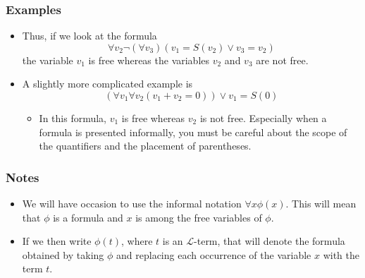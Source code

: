\subsubsection*{Examples}
\begin{itemize}
    \item Thus, if we look at the formula
    $$
    \forall v_{2} \neg\left(\forall v_{3}\right)\left(v_{1}=S\left(v_{2}\right) \vee v_{3}=v_{2}\right)
    $$
    the variable $v_{1}$ is free whereas the variables $v_{2}$ and $v_{3}$ are not free. 
    \item A slightly more complicated example is
        \[
        \left(\forall v_{1} \forall v_{2}\left(v_{1}+v_{2}=0\right)\right) \vee v_{1}=S(0)
        \]
        \begin{itemize}
            \item In this formula, $v_{1}$ is free whereas $v_{2}$ is not free. Especially when a formula is presented informally, you must be careful about the scope of the quantifiers and the placement of parentheses.
        \end{itemize}
\end{itemize}

\subsubsection*{Notes}
\begin{itemize}
    \item We will have occasion to use the informal notation $\forall x \phi(x)$. This will mean that $\phi$ is a formula and $x$ is among the free variables of $\phi$. 
    \item If we then write $\phi(t)$, where $t$ is an $\mathcal{L}$-term, that will denote the formula obtained by taking $\phi$ and replacing each occurrence of the variable $x$ with the term $t$. 
\end{itemize}
















